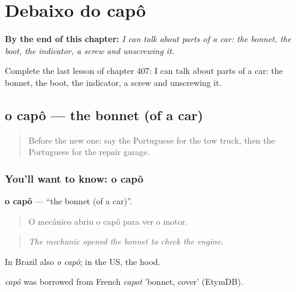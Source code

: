 
\chapter{Debaixo do capô}
\label{ch:pt-debaixo-do-capo}

\begin{chapteropening}
\textbf{By the end of this chapter:} \emph{I can talk about parts of a car: the bonnet, the boot, the indicator, a screw and unscrewing it.}

Complete the last lesson of chapter 407: I can talk about parts of a car: the bonnet, the boot, the indicator, a screw and unscrewing it.
\end{chapteropening}

\section[o capô]{o capô — the bonnet (of a car)}

\label{lesson:PT-C407-capo}



\begin{quote}
Before the new one: say the Portuguese for the tow truck, then the Portuguese for the repair garage.
\end{quote}

\subsection*{You'll want to know: o capô}
\textbf{o capô} — \textquotedblleft{}the bonnet (of a car)\textquotedblright{}.

\begin{quote}
O mecânico abriu o capô para ver o motor.
\end{quote}

\begin{quote}
\emph{The mechanic opened the bonnet to check the engine.}
\end{quote}

In Brazil also \emph{o capô}; in the US, the hood.

\begin{cousinweb}
\emph{capô} was borrowed from French \emph{capot} 'bonnet, cover' (EtymDB).
\end{cousinweb}

